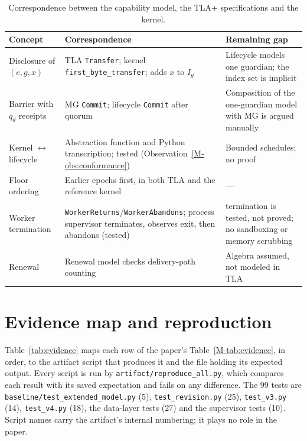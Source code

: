 \documentclass[pdflatex,sn-mathphys-num]{sn-jnl}
\newcommand{\code}[1]{\texttt{#1}}
\begin{document}
\begin{table}[htbp]
\caption{Correspondence between the capability model, the TLA+ specifications and the kernel.}\label{tab:refine}
\centering\footnotesize
\begin{tabularx}{\linewidth}{@{}>{\raggedright\arraybackslash}p{.22\linewidth}YY@{}}\toprule
Concept & Correspondence & Remaining gap\\\midrule
Disclosure of $(e,g,x)$ & TLA \code{Transfer}; kernel \code{first\_byte\_transfer}; adds $x$ to $I_g$ & Lifecycle models one guardian; the index set is implicit\\
Barrier with $q_d$ receipts & MG \code{Commit}; lifecycle \code{Commit} after quorum & Composition of the one-guardian model with MG is argued manually\\
Kernel $\leftrightarrow$ lifecycle & Abstraction function and Python transcription; tested (Observation~\ref{M-obs:conformance}) & Bounded schedules; no proof\\
Floor ordering & Earlier epochs first, in both TLA and the reference kernel & ---\\
Worker termination & \code{WorkerReturns}/\code{WorkerAbandons}; process supervisor terminates, observes exit, then abandons (tested) & termination is tested, not proved; no sandboxing or memory scrubbing\\
Renewal & Renewal model checks delivery-path counting & Algebra assumed, not modeled in TLA\\\bottomrule
\end{tabularx}
\end{table}

\section{Evidence map and reproduction}\label{sec:s-evidence}

Table~\ref{tab:evidence} maps each row of the paper's Table~\ref{M-tab:evidence}, in order, to the artifact script that produces it and the file holding its expected output. Every script is run by \code{artifact/reproduce\_all.py}, which compares each result with its saved expectation and fails on any difference. The 99 tests are \code{baseline/test\_extended\_model.py} (5), \code{test\_revision.py} (25), \code{test\_v3.py} (14), \code{test\_v4.py} (18), the data-layer tests (27) and the supervisor tests (10). Script names carry the artifact's internal numbering; it plays no role in the paper.
\end{document}
